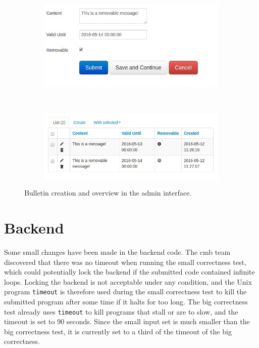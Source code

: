 \begin{figure}
    \centering
    \begin{subfigure}[b]{0.48\textwidth}
        \includegraphics[width=\textwidth]{figs/bulletin_creation.jpg}
    \end{subfigure}
    ~ %
    \begin{subfigure}[b]{0.48\textwidth}
        \includegraphics[width=\textwidth]{figs/bulletin_list.jpg}
    \end{subfigure}
    \caption{Bulletin creation and overview in the admin interface.}
    \label{fig:admin-bulletin}
\end{figure}

\section{Backend}
\label{sec:impr-backend}
Some small changes have been made in the backend code. The \gls{cmb} team discovered that there was no timeout when running the small correctness test, which could potentially lock the backend if the submitted code contained infinite loops. Locking the backend is not acceptable under any condition, and the Unix program \texttt{timeout} \cite{TIMEOUT} is therefore used during the small correctness test to kill the submitted program after some time if it halts for too long. The big correctness test already uses \texttt{timeout} to kill programs that stall or are to slow, and the timeout is set to 90 seconds. Since the small input set is much smaller than the big correctness test, it is currently set to a third of the timeout of the big correctness. \\

